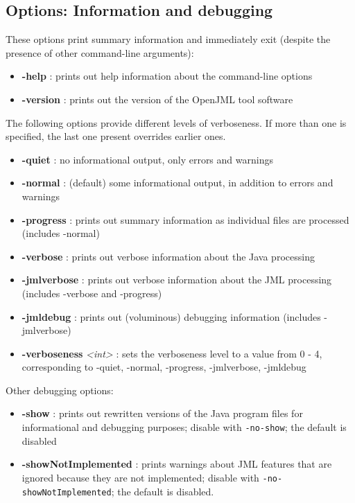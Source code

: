 \subsection{Options: Information and debugging}
\label{OptionsDebugging}
These options print summary information and immediately exit (despite the presence of other command-line arguments):
\begin{itemize}
\item \textbf{-help} : prints out help information about the command-line options
\item \textbf{-version} : prints out the version of the OpenJML tool software
\end{itemize}
The following options provide different levels of verboseness. If more than one is specified, the last one present overrides earlier ones.
\begin{itemize}
\item \textbf{-quiet} : no informational output, only errors and warnings
\item \textbf{-normal} : (default) some informational output, in addition to errors and warnings
\item \textbf{-progress} : prints out summary information as individual files are processed (includes -normal)
\item \textbf{-verbose} : prints out verbose information about the Java processing
\item \textbf{-jmlverbose} : prints out verbose information about the JML processing (includes -verbose and -progress)
\item \textbf{-jmldebug} : prints out (voluminous) debugging information (includes -jmlverbose)
\item \textbf{-verboseness} {\it <int>} : sets the verboseness level to a value from 0 - 4, corresponding to -quiet, -normal, -progress, -jmlverbose, -jmldebug
\end{itemize}

Other debugging options:
\begin{itemize}
\item \textbf{-show} : prints out rewritten versions of the Java program files for informational and debugging purposes; disable
with \texttt{-no-show}; the default is disabled
\item \textbf{-showNotImplemented} : prints warnings about JML features that are ignored because they are not implemented; 
disable with \texttt{-no-showNotImplemented}; the default is disabled.
\end{itemize}


